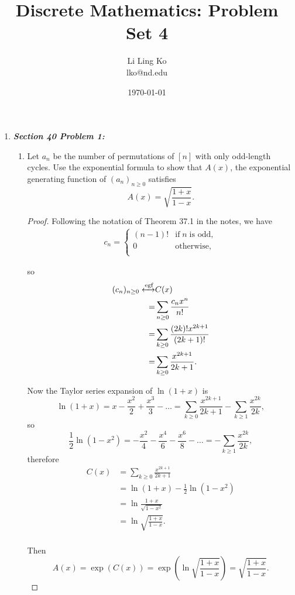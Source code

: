 \documentclass{article}
\begin{document}
\title{Discrete Mathematics: Problem Set 4}
\author{Li Ling Ko\\ lko@nd.edu}
\date{\today}
\maketitle

\begin{enumerate}[label={\bf Q\arabic*:}]
  \item \it \textbf{Section 40 Problem 1:}
    \begin{enumerate}
      \item Let $a_n$ be the number of permutations of $[n]$ with only
        odd-length cycles. Use the exponential formula to show that $A(x)$,
        the exponential generating function of $(a_n)_{n\geq0}$ satisfies
        \[A(x) = \sqrt{\frac{1+x}{1-x}}.\]

        \begin{proof}
          Following the notation of Theorem 37.1 in the notes, we have
          \begin{align*}
            c_n =
            \begin{cases}
              (n-1)! &\text{if}\; n\; \text{is odd},\\
              0 &\text{otherwise},\\
            \end{cases}
          \end{align*}

          so
          \begin{align*}
            (c_n)_{n\geq0}\xleftrightarrow{\text{egf}} &C(x)\\
            =&\sum_{n\geq0} \frac{c_nx^n}{n!}\\
            =&\sum_{k\geq0} \frac{(2k)!x^{2k+1}}{(2k+1)!}\\
            =&\sum_{k\geq0} \frac{x^{2k+1}}{2k+1}.\\
          \end{align*}

          Now the Taylor series expansion of $\ln{(1+x)}$ is
          \[\ln{(1+x)} =x -\frac{x^2}{2} +\frac{x^3}{3} -\ldots
          =\sum_{k\geq0} \frac{x^{2k+1}}{2k+1} -\sum_{k\geq1}
          \frac{x^{2k}}{2k},\]
          so
          \[\frac{1}{2}\ln{(1-x^2)} =-\frac{x^2}{4} -\frac{x^4}{6}
          -\frac{x^6}{8} -\ldots =-\sum_{k\geq1} \frac{x^{2k}}{2k},\]
          therefore
          \begin{align*}
            C(x) &=\sum_{k\geq0} \frac{x^{2k+1}}{2k+1}\\
            &=\ln{(1+x)} -\frac{1}{2}\ln{(1-x^2)}\\
            &=\ln{\frac{1+x}{\sqrt{1-x^2}}}\\
            &=\ln{\sqrt{\frac{1+x}{1-x}}}.\\
          \end{align*}

          Then
          \[A(x) =\exp{\left(C(x)\right)}
          =\exp{\left(\ln{\sqrt{\frac{1+x}{1-x}}}\right)}
          =\sqrt{\frac{1+x}{1-x}}.\]
        \end{proof}
    \end{enumerate}
\end{enumerate}
\end{document}
